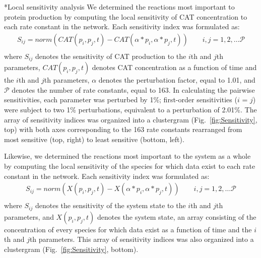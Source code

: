 \documentclass[12pt]{article}
\makeatletter
\renewcommand\subsection{\@startsection
	{subsection}{2}{0mm}
	{-0.05in}
	{-0.5\baselineskip}
	{\normalfont\normalsize\bfseries}}
\makeatother
\begin{document}
\subsection*{Local sensitivity analysis}
We determined the reactions most important to protein production by computing the local sensitivity of CAT concentration to each rate constant in the network.
Each sensitivity index was formulated as:
\begin{equation}\label{eqn:local-sensitivity}
\begin{split}
    S_{ij}=norm(CAT(p_i,p_j,t)-CAT(\alpha*p_i,\alpha*p_j,t))\qquad{i,j=1,2,\hdots\mathcal{P}}\\
\end{split}
\end{equation}
where $S_{ij}$ denotes the sensitivity of CAT production to the $i$th and $j$th parameters, $CAT(p_i,p_j,t)$ denotes CAT concentration as a function of time and the $i$th and $j$th parameters, $\alpha$ denotes the perturbation factor, equal to 1.01, and $\mathcal{P}$ denotes the number of rate constants, equal to 163.
In calculating the pairwise sensitivities, each parameter was perturbed by 1\%; first-order sensitivities ($i$ = $j$) were subject to two 1\% perturbations, equivalent to a perturbation of 2.01\%.
The array of sensitivity indices was organized into a clustergram (Fig.~\ref{fig:Sensitivity}, top) with both axes corresponding to the 163 rate constants rearranged from most sensitive (top, right) to least sensitive (bottom, left).

Likewise, we determined the reactions most important to the system as a whole by computing the local sensitivity of the species for which data exist to each rate constant in the network.
Each sensitivity index was formulated as:
\begin{equation}\label{eqn:local-sensitivity}
\begin{split}
    S_{ij}=norm(X(p_i,p_j,t)-X(\alpha*p_i,\alpha*p_j,t))\qquad{i,j=1,2,\hdots\mathcal{P}}\\
\end{split}
\end{equation}
where $S_{ij}$ denotes the sensitivity of the system state to the $i$th and $j$th parameters, and $X(p_i,p_j,t)$ denotes the system state, an array consisting of the concentration of every species for which data exist as a function of time and the $i$th and $j$th parameters.
This array of sensitivity indices was also organized into a clustergram (Fig.~\ref{fig:Sensitivity}, bottom).
\end{document}
